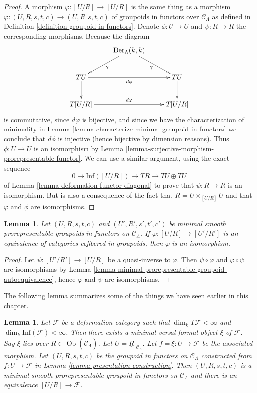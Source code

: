 \documentclass{stacks-project}
\theoremstyle{plain}
\newtheorem{lemma}[subsection]{Lemma}
\theoremstyle{definition}
\theoremstyle{remark}
\numberwithin{equation}{subsection}
\def\Ob{\mathop{\mathrm{Ob}}\nolimits}
\begin{document}
\begin{proof}
A morphism $\varphi : [U/R] \to [U/R]$ is the same thing as a
morphism $\varphi : (U, R, s, t, c) \to (U, R, s, t, c)$ of
groupoids in functors over $\mathcal{C}_\Lambda$ as defined in
Definition \ref{definition-groupoid-in-functors}.
Denote $\phi : U \to U$ and $\psi : R \to R$ the corresponding morphisms.
Because the diagram
$$
\xymatrix{
& \text{Der}_\Lambda(k, k) \ar[dr]_\gamma \ar[dl]^\gamma \\
TU \ar[rr]_{d\phi} \ar[d] & & TU \ar[d]  \\
T[U/R] \ar[rr]^{d\varphi} & & T[U/R]
}
$$
is commutative, since $d\varphi$ is bijective, and since we have
the characterization of minimality in
Lemma \ref{lemma-characterize-minimal-groupoid-in-functors}
we conclude that $d\phi$ is injective (hence bijective by dimension reasons).
Thus $\phi : U \to U$ is an isomorphism by
Lemma \ref{lemma-surjective-morphism-prorepresentable-functor}.
We can use a similar argument, using the exact sequence
$$
0 \to \text{Inf}([U/R]) \to TR \to TU \oplus TU
$$
of
Lemma \ref{lemma-deformation-functor-diagonal}
to prove that $\psi : R \to R$ is an isomorphism. But is also a consequence
of the fact that $R = U \times_{[U/R]} U$ and that $\varphi$ and $\phi$
are isomorphisms.
\end{proof}

\begin{lemma}
\label{lemma-minimal-prorepresentable-groupoid-equivalence}
Let $(U, R, s, t, c)$ and $(U', R', s', t', c')$ be minimal smooth
prorepresentable groupoids in functors on $\mathcal{C}_\Lambda$. If
$\varphi : [U/R] \to [U'/R']$ is an equivalence of categories cofibered
in groupoids, then $\varphi$ is an isomorphism.
\end{lemma}

\begin{proof}
Let $\psi : [U'/R'] \to [U/R]$ be a quasi-inverse to $\varphi$.
Then $\psi \circ \varphi$ and $\varphi \circ \psi$ are isomorphisms by
Lemma \ref{lemma-minimal-prorepresentable-groupoid-autoequivalence},
hence $\varphi$ and $\psi$ are isomorphisms.
\end{proof}

\noindent
The following lemma summarizes some of the things we have seen earlier
in this chapter.

\begin{lemma}
\label{lemma-minimal-groupoid-in-functors-construction}
Let $\mathcal{F}$ be a deformation category such that
$\dim_k T\mathcal{F} <\infty$ and
$\dim_k \text{Inf}(\mathcal{F}) < \infty$.
Then there exists a minimal versal formal object $\xi$ of $\mathcal{F}$.
Say $\xi$ lies over $R \in \Ob(\widehat{\mathcal{C}}_\Lambda)$.
Let $U = \underline{R}|_{\mathcal{C}_\Lambda}$.
Let $f = \underline{\xi} : U \to \mathcal{F}$ be the associated
morphism. Let $(U, R, s, t, c)$ be the groupoid in functors on
$\mathcal{C}_\Lambda$ constructed from $f : U \to \mathcal{F}$ in
Lemma \ref{lemma-presentation-construction}.
Then $(U, R, s, t, c)$ is a minimal smooth prorepresentable
groupoid in functors on $\mathcal{C}_\Lambda$ and there
is an equivalence $[U/R] \to \mathcal{F}$.
\end{lemma}
\end{document}
